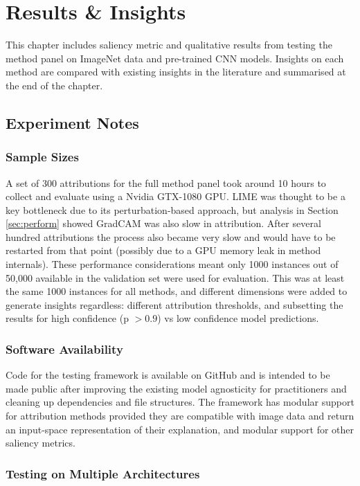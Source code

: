 \documentclass[main]{subfiles}
\begin{document}
\chapter{Results \& Insights}


This chapter includes saliency metric and qualitative results from testing the method panel on ImageNet data and pre-trained CNN models. Insights on each method are compared with existing insights in the literature and summarised at the end of the chapter.

\section{Experiment Notes}

\subsection{Sample Sizes}  \label{sec:data_collection}
A set of 300 attributions for the full method panel took around 10 hours to collect and evaluate using a Nvidia GTX-1080 GPU. LIME was thought to be a key bottleneck due to its perturbation-based approach, but analysis in Section \ref{sec:perform} showed GradCAM was also slow in attribution. After several hundred attributions the process also became very slow and would have to be restarted from that point (possibly due to a GPU memory leak in method internals). These performance considerations meant only 1000 instances out of 50,000 available in the validation set were used for evaluation. This was at least the same 1000 instances for all methods, and different dimensions were added to generate insights regardless: different attribution thresholds, and subsetting the results for high confidence (p $>0.9$) vs low confidence model predictions.

\subsection{Software Availability}

Code for the testing framework is available on GitHub and is intended to be made public after improving the existing model agnosticity for practitioners and cleaning up dependencies and file structures. The framework has modular support for attribution methods provided they are compatible with image data and return an input-space representation of their explanation, and modular support for other saliency metrics.


\subsection{Testing on Multiple Architectures} \label{sec:shap_note}
\end{document}

